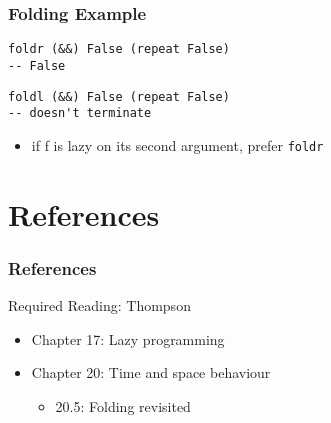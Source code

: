 \documentclass[dvipsnames]{beamer}
\theoremstyle{plain}
\begin{document}
\begin{frame}[fragile]
  \frametitle{Folding Example}

  \begin{lstlisting}
foldr (&&) False (repeat False)
-- False
  \end{lstlisting}

  \pause
  \begin{lstlisting}
foldl (&&) False (repeat False)
-- doesn't terminate
  \end{lstlisting}

  \pause
  \medskip
  \begin{itemize}
    \item if f is lazy on its second argument, prefer \lstinline|foldr|
  \end{itemize}
\end{frame}

\section*{References}

\begin{frame}
  \frametitle{References}

  \begin{block}{Required Reading: Thompson}
    \begin{itemize}
      \item Chapter 17: \alert{Lazy programming}
      \item Chapter 20: Time and space behaviour
      \begin{itemize}
        \item 20.5: \alert{Folding revisited}
      \end{itemize}
    \end{itemize}
  \end{block}
\end{frame}
\end{document}

